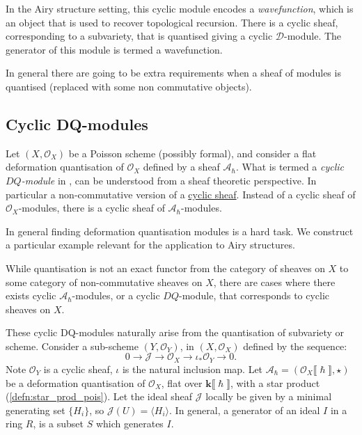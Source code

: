 
    In the Airy structure setting, this cyclic module encodes a \emph{wavefunction}, which is an object that is used to recover topological recursion. There is a cyclic sheaf, corresponding to a subvariety, that is quantised giving a cyclic \( \mathcal{D}\)-module. The generator of this module is termed a wavefunction.
    
    In general there are going to be extra requirements when a sheaf of modules is quantised (replaced with some non commutative objects). 


    \subsection{Cyclic DQ-modules}
    
    
    Let \( (X,\mathcal{O}_X)\) be a Poisson scheme (possibly formal), and consider a flat deformation quantisation of \( \mathcal{O}_X\) defined by a sheaf \( \mathcal{A}_\hslash\). What is termed a \emph{cyclic \( DQ\)-module} in \cite{ks_airy}, can be understood from a sheaf theoretic perspective. In particular a non-commutative version of a \hyperref[defn:cyclicsheaf]{cyclic sheaf}. Instead of a cyclic sheaf of \( \mathcal{O}_X\)-modules, there is a cyclic sheaf of \( \mathcal{A}_{\hslash}\)-modules.

    In general finding deformation quantisation modules is a hard task. We construct a particular example relevant for the application to Airy structures.
    
    While quantisation is not an exact functor from the category of sheaves on \(X\) to some category of non-commutative sheaves on \(X\), there are cases where there exists cyclic \( \mathcal{A}_\hslash\)-modules, or a cyclic \(DQ\)-module, that corresponds to cyclic sheaves on \(X\). 
    
    These cyclic DQ-modules naturally arise from the quantisation of subvariety or scheme. Consider a sub-scheme \((Y,\mathcal{O}_Y)\), in \((X, \mathcal{O}_X)\) defined by the sequence:
    \[ 0\rightarrow \mathcal{J} \rightarrow \mathcal{O}_X \rightarrow \iota_*\mathcal{O}_Y \rightarrow 0.\]
    Note \( \mathcal{O}_Y\) is a cyclic sheaf, \( \iota \) is the natural inclusion map. Let \( \mathcal{A}_{\hslash} = (\mathcal{O}_X \lBrack \hslash \rBrack, \star) \) be a deformation quantisation of \( \mathcal{O}_X\), flat over \( \mathbf{k}\lBrack \hslash \rBrack\), with a star product (\ref{defn:star_prod_pois}). Let the ideal sheaf \( \mathcal{J}\) locally be given by a minimal generating set \( \{ H_i\} \), so \( \mathcal{J}(U) = \langle H_i \rangle \). In general, a generator of an ideal \(I\) in a ring \(R\), is a subset \(S\) which generates \(I\).
    
